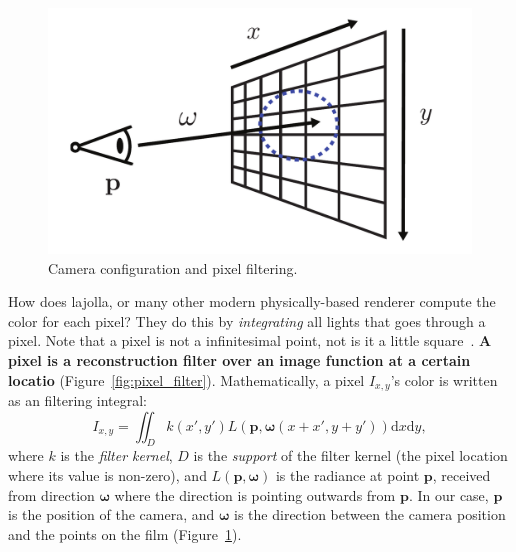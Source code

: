 \documentclass{article}
\begin{document}
\begin{figure}[h]
    \centering
    \includegraphics[width=0.4\linewidth]{imgs/camera.pdf}
    \caption{Camera configuration and pixel filtering.}
    \label{fig:camera}
\end{figure}

How does lajolla, or many other modern physically-based renderer compute the color for each pixel? They do this by \emph{integrating} all lights that goes through a pixel. Note that a pixel is not a infinitesimal point, not is it a little square~\cite{Smith:1995:PLS}. \textbf{A pixel is a reconstruction filter over an image function at a certain locatio} (Figure~\ref{fig:pixel_filter}). Mathematically, a pixel $I_{x, y}$'s color is written as an filtering integral:
\begin{equation}
    I_{x, y} = \iint_{D} k(x', y') L(\mathbf{p}, \mathbf{\omega}(x + x', y + y')) \mathrm{d}x\mathrm{d}y,
    \label{eq:pixel_filter}
\end{equation}
where $k$ is the \emph{filter kernel}, $D$ is the \emph{support} of the filter kernel (the pixel location where its value is non-zero), and $L(\mathbf{p}, \mathbf{\omega})$ is the radiance at point $\mathbf{p}$, received from direction $\mathbf{\omega}$ where the direction is pointing outwards from $\mathbf{p}$. In our case, $\mathbf{p}$ is the position of the camera, and $\mathbf{\omega}$ is the direction between the camera position and the points on the film (Figure~\ref{fig:camera}).
\end{document}
